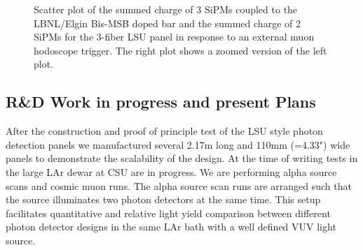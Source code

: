 %
\begin{figure}[htb]
  \begin{center}
\caption{Scatter plot of the summed charge of 3 SiPMs coupled to the
  LBNL/Elgin Bis-MSB doped bar and the summed charge of 2 SiPMs for
  the 3-fiber LSU panel in response to an external muon hodoscope
  trigger. The right plot shows a zoomed version of the left plot.}
\label{fig3-LSU} 
\end{center}
\end{figure}
%
%

\subsection{R\&D Work in progress and present Plans }

After the construction and proof of principle test of the LSU style
photon detection panels we manufactured several 2.17m long and 110mm
(=4.33") wide panels to demonstrate the scalability of the design.  At
the time of writing tests in the large LAr dewar at CSU are in
progress.  We are performing alpha source scans and cosmic muon runs.
The alpha source scan runs are arranged such that the source
illuminates two photon detectors at the same time.  This setup
facilitates quantitative and relative light yield comparison between
different photon detector designs in the same LAr bath with a well
defined VUV light source.

